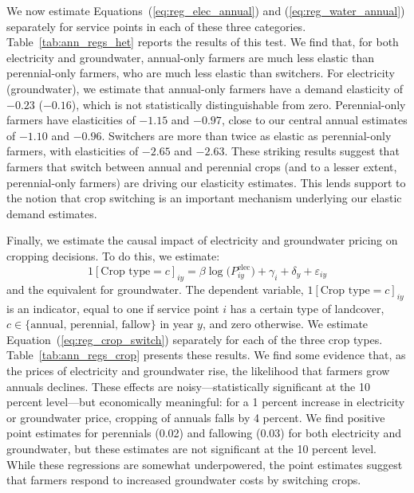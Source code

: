 We now estimate Equations~(\ref{eq:reg_elec_annual}) and (\ref{eq:reg_water_annual}) separately for service points in each of these three categories. Table~\ref{tab:ann_regs_het} reports the results of this test. We find that, for both electricity and groundwater, annual-only farmers are much less elastic than perennial-only farmers, who are much less elastic than switchers. For electricity (groundwater), we estimate that annual-only farmers have a demand elasticity of $-0.23$ ($-0.16$), which is not statistically distinguishable from zero. Perennial-only farmers have elasticities of $-1.15$ and $-0.97$, close to our central annual estimates of $-1.10$ and $-0.96$. Switchers are more than twice as elastic as perennial-only farmers, with elasticities of $-2.65$ and $-2.63$. These striking results suggest that farmers that switch between annual and perennial crops (and to a lesser extent, perennial-only farmers) are driving our elasticity estimates. This lends support to the notion that crop switching is an important mechanism underlying our elastic demand estimates.

Finally, we estimate the causal impact of electricity and groundwater pricing on cropping decisions. To do this, we estimate:
\begin{equation}
1[\text{Crop type} = c]_{iy} = \beta\log\big({P}^{\text{elec}}_{iy}\big) + \gamma_{i} + \delta_y + \varepsilon_{iy} \label{eq:reg_crop_switch} 
\end{equation}
and the equivalent for groundwater. The dependent variable, $1[\text{Crop type} = c]_{iy}$ is an indicator, equal to one if service point $i$ has a certain type of landcover, $c \in \{\text{annual, perennial, fallow} \}$ in year $y$, and zero otherwise. We estimate Equation~(\ref{eq:reg_crop_switch}) separately for each of the three crop types. Table~\ref{tab:ann_regs_crop} presents these results. We find some evidence that, as the prices of electricity and groundwater rise, the likelihood that farmers grow annuals declines. These effects are noisy---statistically significant at the 10 percent level---but economically meaningful: for a 1 percent increase in electricity or groundwater price, cropping of annuals falls by 4 percent. We find positive point estimates for perennials (0.02) and fallowing (0.03) for both electricity and groundwater, but these estimates are not significant at the 10 percent level. While these regressions are somewhat underpowered, the point estimates suggest that farmers respond to increased groundwater costs by switching crops. 






